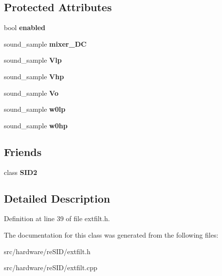 \subsection*{Protected Attributes}
\begin{DoxyCompactItemize}
\item 
\hypertarget{classExternalFilter_ab7b67b4c81943ab2f2af2f0f3096be4d}{bool {\bfseries enabled}}\label{classExternalFilter_ab7b67b4c81943ab2f2af2f0f3096be4d}

\item 
\hypertarget{classExternalFilter_ac9d6f496a015d907b6810104f4156931}{sound\-\_\-sample {\bfseries mixer\-\_\-\-D\-C}}\label{classExternalFilter_ac9d6f496a015d907b6810104f4156931}

\item 
\hypertarget{classExternalFilter_afd2a212e05685a31bd38155461f40966}{sound\-\_\-sample {\bfseries Vlp}}\label{classExternalFilter_afd2a212e05685a31bd38155461f40966}

\item 
\hypertarget{classExternalFilter_adb2d046b8cb92ff14843d7de5636b963}{sound\-\_\-sample {\bfseries Vhp}}\label{classExternalFilter_adb2d046b8cb92ff14843d7de5636b963}

\item 
\hypertarget{classExternalFilter_a5da6ca8f408db655048a188cb3ec6f34}{sound\-\_\-sample {\bfseries Vo}}\label{classExternalFilter_a5da6ca8f408db655048a188cb3ec6f34}

\item 
\hypertarget{classExternalFilter_ae1de834c95a9db30c2508c3a77178c0b}{sound\-\_\-sample {\bfseries w0lp}}\label{classExternalFilter_ae1de834c95a9db30c2508c3a77178c0b}

\item 
\hypertarget{classExternalFilter_a20cc34857e4724f75391c21fb589dc1e}{sound\-\_\-sample {\bfseries w0hp}}\label{classExternalFilter_a20cc34857e4724f75391c21fb589dc1e}

\end{DoxyCompactItemize}
\subsection*{Friends}
\begin{DoxyCompactItemize}
\item 
\hypertarget{classExternalFilter_a906a1c7f73b30e819416802226bba3ff}{class {\bfseries S\-I\-D2}}\label{classExternalFilter_a906a1c7f73b30e819416802226bba3ff}

\end{DoxyCompactItemize}


\subsection{Detailed Description}


Definition at line 39 of file extfilt.\-h.



The documentation for this class was generated from the following files\-:\begin{DoxyCompactItemize}
\item 
src/hardware/re\-S\-I\-D/extfilt.\-h\item 
src/hardware/re\-S\-I\-D/extfilt.\-cpp\end{DoxyCompactItemize}
